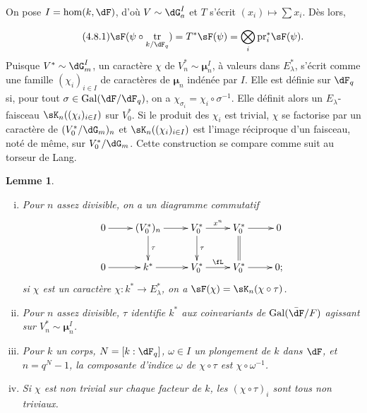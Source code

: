 \documentclass[oneside]{book}
\DeclareMathOperator{\gal}{Gal}
\DeclareMathOperator{\tr}{tr}
\newcommand{\dmu}{{\bm\mu}}
\newcommand{\pr}{\mathrm{pr}} %
\theoremstyle{sga-source}
\theoremstyle{sga-source-dash}
\theoremstyle{sga-source-dotdash}
\theoremstyle{sga-source-number-note-dash}
\theoremstyle{sga-source-note-number-dotdash}
\theoremstyle{sga-source-example-dotdash}
\theoremstyle{sga-source-inline-number}
\theoremstyle{sga-source-bare-number}
\theoremstyle{sga-source}
\newtheorem{lemma_}[subsection]{Lemme}
\newcommand{\PrintPage}[1]{}\newcommand{\MathPage}[1]{}\newcommand{\PrintCite}[2]{#1}\newcommand{\var}[3]{#1}
\begin{document}
On pose $I=\hom(k,\dF)$, d'où $V\sim \dG_a^I$ et $T$ s'écrit 
$(x_i)\mapsto \sum x_i$. Dès lors, 
\PrintPage{200}
\begin{equation*}\tag{4.8.1}\label{VI:eq:4-8-1}
  \sF(\psi\circ \tr_{k/\dF_q}) = T^\ast \sF(\psi) = \bigotimes_i \pr_i^\ast \sF(\psi) \text{.} 
\end{equation*}
Puisque $V^\ast\sim \dG_m^I$, un caractère $\chi$ de $V_n^\ast\sim \dmu_n^I$, 
à valeurs dans $E_\lambda^\ast$, s'écrit comme une famille 
$(\chi_i)_{i\in I}$ de caractères de $\dmu_n$ \var{indénée par $I$}{indexée par $I$}{S45-SOL-0817}. Elle est 
définie sur $\dF_q$ si, pour tout $\sigma\in \gal(\dF/\dF_q)$, on a 
$\chi_{\sigma_i} = \chi_i\circ \sigma^{-1}$. Elle définit alors un 
$E_\lambda$-faisceau $\sK_n((\chi_i)_{i\in I})$ sur $V_0^\ast$. Si le produit 
des $\chi_i$ est trivial, $\chi$ se factorise par un caractère de 
$(V_0^\ast/\dG_m)_n$ et $\sK_n((\chi_i)_{i\in I})$ est l'image réciproque 
d'un faisceau, noté de même, sur $V_0^\ast/\dG_m$. Cette construction se 
compare comme suit au torseur de Lang. 





\begin{lemma_}\label{VI:4-9}
\begin{enumerate}[(i)]
  \item Pour $n$ assez divisible, on a un diagramme commutatif 
    \[\xymatrix{
      0 \ar[r] 
        & (V_0^\ast)_n \ar[r] \ar[d]^-\tau 
        & V_0^\ast \ar[r]^-{x^n} \ar[d]^-\tau 
        & V_0^\ast \ar[r] \ar@{=}[d] 
        & 0 \\
      0 \ar[r] 
        & k^\ast \ar[r] 
        & V_0^\ast \ar[r]^-\fL 
        & V_0^\ast \ar[r] 
        & 0 \text{;} 
    }\]
    si $\chi$ est un caractère $\chi:k^\ast \to E_\lambda^\ast$, on a 
    $\sF(\chi) = \sK_n(\chi\circ\tau)$. 
  \item Pour $n$ assez divisible, $\tau$ identifie $k^\ast$ aux coinvariants 
    de $\var{\gal(\bar\dF/F)}{\gal(\dF/\dF_q)}{S45-SOL-0819}$ agissant sur $V_n^\ast\sim \dmu_n^I$. 
  \item Pour $k$ un corps, $N=[k:\dF_q]$, $\omega\in I$ un plongement de $k$ 
    dans $\dF$, et $n=q^N-1$, la composante d'indice $\omega$ de 
    $\chi\circ\tau$ est $\chi\circ \omega^{-1}$. 
  \item Si $\chi$ est non trivial sur chaque facteur de $k$, les 
    $(\chi\circ \tau)_i$ sont tous non triviaux. 
\end{enumerate}
\end{lemma_}
\end{document}
